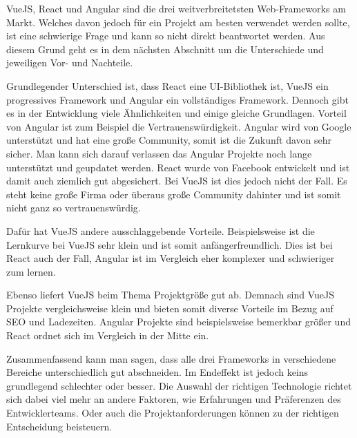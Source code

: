 VueJS, React und Angular sind die drei weitverbreitetsten Web-Frameworks am Markt. Welches davon jedoch für ein Projekt am besten verwendet werden sollte, ist eine schwierige Frage und kann so nicht direkt beantwortet werden. Aus diesem Grund geht es in dem nächsten Abschnitt um die Unterschiede und jeweiligen Vor- und Nachteile.

Grundlegender Unterschied ist, dass React eine UI-Bibliothek ist, VueJS ein progressives Framework und Angular ein vollständiges Framework. Dennoch gibt es in der Entwicklung viele Ähnlichkeiten und einige gleiche Grundlagen.
Vorteil von Angular ist zum Beispiel die Vertrauenswürdigkeit. Angular wird von Google unterstützt und hat eine große Community, somit ist die Zukunft davon sehr sicher. Man kann sich darauf verlassen das Angular Projekte noch lange unterstützt und geupdatet werden. React wurde von Facebook entwickelt und ist damit auch ziemlich gut abgesichert. Bei VueJS ist dies jedoch nicht der Fall. Es steht keine große Firma oder überaus große Community dahinter und ist somit nicht ganz so vertrauenswürdig.

Dafür hat VueJS andere ausschlaggebende Vorteile. Beispielsweise ist die Lernkurve bei VueJS sehr klein und ist somit anfängerfreundlich. Dies ist bei React auch der Fall, Angular ist im Vergleich eher komplexer und schwieriger zum lernen.

Ebenso liefert VueJS beim Thema Projektgröße gut ab. Demnach sind VueJS Projekte vergleichsweise klein und bieten somit diverse Vorteile im Bezug auf SEO und Ladezeiten. Angular Projekte sind beispielsweise bemerkbar größer und React ordnet sich im Vergleich in der Mitte ein.

Zusammenfassend kann man sagen, dass alle drei Frameworks in verschiedene Bereiche unterschiedlich gut abschneiden. Im Endeffekt ist jedoch keins grundlegend schlechter oder besser. Die Auswahl der richtigen Technologie richtet sich dabei viel mehr an andere Faktoren, wie Erfahrungen und Präferenzen des Entwicklerteams. Oder auch die Projektanforderungen können zu der richtigen Entscheidung beisteuern.

\cite{frontend_web_comparison}
